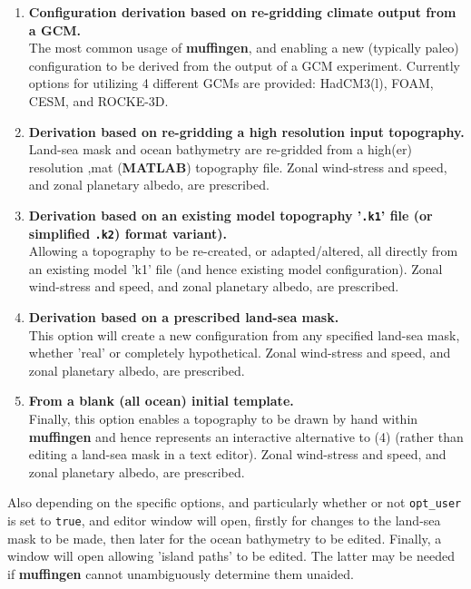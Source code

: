 \documentclass[11pt,fleqn]{book} %
\begin{document}
\begin{enumerate}[noitemsep]
\setlength{\itemindent}{.2in}
\setcounter{enumi}{0}
\vspace{1mm}
\item \textbf{Configuration derivation based on re-gridding climate output from a GCM.}
\\ The most common usage of \textbf{muffingen}, and enabling a new (typically paleo) configuration to be derived from the output of a GCM experiment. Currently options for utilizing 4 different GCMs are provided: HadCM3(l), FOAM, CESM, and ROCKE-3D.
\vspace{1mm}
\item \textbf{Derivation based on re-gridding a high resolution input topography.}
\\ Land-sea mask and ocean bathymetry are re-gridded from a high(er) resolution ,mat (\textbf{MATLAB}) topography file. Zonal wind-stress and speed, and zonal planetary albedo, are prescribed.
\vspace{1mm}
\item \textbf{Derivation based on an existing model topography '\texttt{.k1}' file (or simplified \texttt{.k2}) format variant).} 
\\ Allowing a topography to be re-created, or adapted/altered, all directly from an existing model 'k1' file (and hence existing model configuration). Zonal wind-stress and speed, and zonal planetary albedo, are prescribed.
\vspace{1mm}
\item \textbf{Derivation based on a prescribed land-sea mask.}
\\ This option will create a new configuration from any specified land-sea mask, whether 'real' or completely hypothetical. Zonal wind-stress and speed, and zonal planetary albedo, are prescribed.
\vspace{1mm}
\item \textbf{From a blank (all ocean) initial template.}
\\ Finally, this option enables a topography to be drawn by hand within \textbf{muffingen} and hence represents an interactive alternative to (4) (rather than editing a land-sea mask in a text editor). Zonal wind-stress and speed, and zonal planetary albedo, are prescribed.
\end{enumerate} 

\vspace{2mm}
Also depending on the specific options, and particularly whether or not \texttt{opt\_user} is set to \texttt{true}, and editor window will open, firstly for changes to the land-sea mask to be made, then later for the ocean bathymetry to be edited. Finally, a window will open allowing 'island paths' to be edited. The latter may be needed if \textbf{muffingen} cannot unambiguously determine them unaided.
\end{document}
